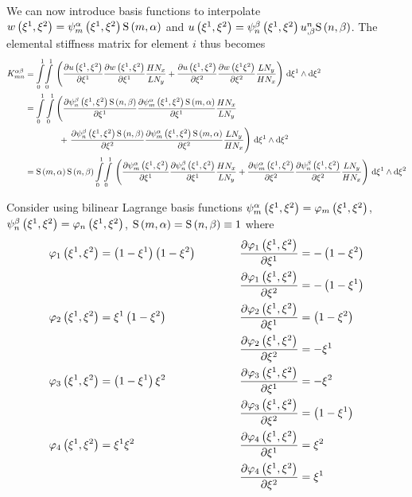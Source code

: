 We can now introduce basis functions to interpolate \ie
$\fnof{w}{\xione,\xitwo}=\gbfn{m}{\alpha}{\xione,\xitwo}\gsf{m}{\alpha}$
and
$\fnof{u}{\xione,\xitwo}=\gbfn{n}{\beta}{\xione,\xitwo}\nodedof{u}{n}{\beta}\gsf{n}{\beta}$. The
elemental stiffness matrix for element $i$ thus becomes
\begin{equation}
  \begin{aligned}
    K^{\alpha\beta}_{mn}&=\giint{0}{1}{0}{1}{\pbrac{\delby{\fnof{u}{\xione,\xitwo}}{\xione}
        \delby{\fnof{w}{\xione,\xitwo}}{\xione}\dfrac{H N_{x}}{L N_{y}}+
        \delby{\fnof{u}{\xione,\xitwo}}{\xitwo}\delby{\fnof{w}{\xione\xitwo}}{\xitwo}\dfrac{L N_{y}}{H N_{x}}}}{\xione}{\xitwo} \\
    &=\dintl{0}{1}\dintl{0}{1}\left(\delby{\gbfn{n}{\beta}{\xione,\xitwo}\gsf{n}{\beta}}{\xione}
      \delby{\gbfn{m}{\alpha}{\xione,\xitwo}\gsf{m}{\alpha}}{\xione}\dfrac{H N_{x}}{L N_{y}} \right.\\
      &\qquad\qquad+\left.\delby{\gbfn{n}{\beta}{\xione,\xitwo}\gsf{n}{\beta}}{\xitwo}
      \delby{\gbfn{m}{\alpha}{\xione,\xitwo}\gsf{m}{\alpha}}{\xitwo}\dfrac{L N_{y}}{H N_{x}}\right)
      \infinitesimaltwo{\xione}{\xitwo}\\
    &=\gsf{m}{\alpha}\gsf{n}{\beta}\giint{0}{1}{0}{1}{\pbrac{\delby{\gbfn{m}{\alpha}{\xione,\xitwo}}{\xione}
        \delby{\gbfn{n}{\beta}{\xione,\xitwo}}{\xione}\dfrac{H N_{x}}{L N_{y}}+
        \delby{\gbfn{m}{\alpha}{\xione,\xitwo}}{\xitwo}\delby{\gbfn{n}{\beta}{\xione,\xitwo}}{\xitwo}
        \dfrac{L N_{y}}{H N_{x}}}}{\xione}{\xitwo}
  \end{aligned}
\end{equation}

Consider using bilinear Lagrange basis functions \ie
$\gbfn{m}{\alpha}{\xione,\xitwo}=\lbfn{m}{\xione,\xitwo}$,
$\gbfn{n}{\beta}{\xione,\xitwo}=\lbfn{n}{\xione,\xitwo}$,
$\gsf{m}{\alpha}=\gsf{n}{\beta}\equiv 1$ where
\begin{alignat*}{3}
  \lbfn{1}{\xione,\xitwo}&=\pbrac{1-\xione}\pbrac{1-\xitwo}&\quad&&\delby{\lbfn{1}{\xione,\xitwo}}{\xione}&=-\pbrac{1-\xitwo}\\
  &&&&\delby{\lbfn{1}{\xione,\xitwo}}{\xitwo}&=-\pbrac{1-\xione} \\
  \lbfn{2}{\xione,\xitwo}&=\xione\pbrac{1-\xitwo}&\qquad&&\delby{\lbfn{2}{\xione,\xitwo}}{\xione}&=\pbrac{1-\xitwo}\\
  &&&&\delby{\lbfn{2}{\xione,\xitwo}}{\xitwo}&=-\xione\\
  \lbfn{3}{\xione,\xitwo}&=\pbrac{1-\xione}\xitwo&\qquad&&\delby{\lbfn{3}{\xione,\xitwo}}{\xione}&=-\xitwo\\
  &&&&\delby{\lbfn{3}{\xione,\xitwo}}{\xitwo}&=\pbrac{1-\xione}\\
  \lbfn{4}{\xione,\xitwo}&=\xione\xitwo&\qquad&&\delby{\lbfn{4}{\xione,\xitwo}}{\xione}&=\xitwo\\
  &&&&\delby{\lbfn{4}{\xione,\xitwo}}{\xitwo}&=\xione
\end{alignat*}

